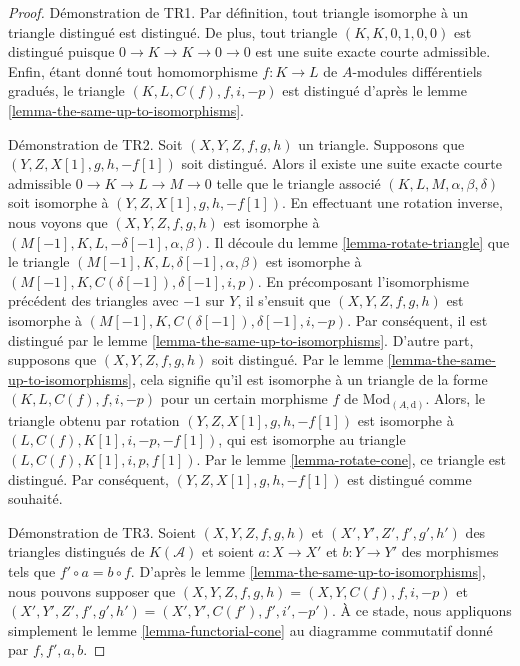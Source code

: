 \begin{proof}
Démonstration de TR1. Par définition, tout triangle isomorphe à un triangle
distingué est distingué. De plus, tout triangle $(K, K, 0, 1, 0,
0)$ est distingué puisque $0 \to K \to K \to 0 \to 0$ est
une suite exacte courte admissible. Enfin, étant donné tout homomorphisme
$f : K \to L$ de $A$-modules différentiels gradués, le triangle
$(K, L, C(f), f, i, -p)$ est distingué d'après le
lemme \ref{lemma-the-same-up-to-isomorphisms}.

\medskip\noindent
Démonstration de TR2. Soit $(X, Y, Z, f, g, h)$ un
triangle. Supposons que $(Y, Z, X[1], g, h, -f[1])$ soit
distingué. Alors il existe une suite exacte courte admissible
$0 \to K \to L \to M \to 0$ telle que le triangle
associé $(K, L, M, \alpha, \beta, \delta)$ soit
isomorphe à $(Y, Z, X[1], g, h, -f[1])$. En effectuant une rotation inverse,
nous voyons que $(X, Y, Z, f, g, h)$ est
isomorphe à $(M[-1], K, L, -\delta[-1], \alpha,
\beta)$. Il découle du lemme \ref{lemma-rotate-triangle} que le triangle
$(M[-1], K, L, \delta[-1], \alpha, \beta)$ est
isomorphe à $(M[-1],
K, C(\delta[-1]), \delta[-1], i, p)$. En
précomposant l'isomorphisme précédent des triangles avec $-1$ sur $Y$, il s'ensuit
que $(X, Y, Z, f, g, h)$ est isomorphe à $(M[-1], K,
C(\delta[-1]), \delta[-1], i, -p)$. Par conséquent, il
est distingué par le lemme
\ref{lemma-the-same-up-to-isomorphisms}. D'autre part,
supposons que $(X, Y, Z, f, g, h)$ soit distingué. Par le lemme
\ref{lemma-the-same-up-to-isomorphisms}, cela signifie qu'il est isomorphe à un
triangle de la forme $(K, L, C(f), f, i, -p)$
pour un certain morphisme $f$ de $\text{Mod}_{(A,
\text{d})}$. Alors, le triangle obtenu par rotation $(Y, Z,
X[1], g, h, -f[1])$ est isomorphe à
$(L, C(f), K[1], i, -p, -f[1])$, qui est isomorphe au
triangle $(L, C(f), K[1], i, p,
f[1])$. Par le lemme
\ref{lemma-rotate-cone}, ce triangle est distingué. Par conséquent, $(Y, Z, X[1], g,
h, -f[1])$ est distingué comme souhaité.

\medskip\noindent
Démonstration de TR3. Soient $(X, Y, Z, f, g, h)$ et $(X', Y', Z', f', g',
h')$ des triangles distingués de $K(\mathcal{A})$ et soient $a : X \to X'$
et $b : Y \to Y'$ des morphismes tels que $f' \circ a = b \circ f$. D'après
le lemme \ref{lemma-the-same-up-to-isomorphisms}, nous pouvons supposer
que $(X, Y, Z, f, g, h) = (X, Y, C(f), f, i, -p)$ et
$(X', Y', Z', f', g', h') = (X', Y', C(f'), f', i', -p')$. À ce
stade, nous appliquons simplement le lemme \ref{lemma-functorial-cone}
au diagramme commutatif donné par $f, f', a, b$.
\end{proof}

